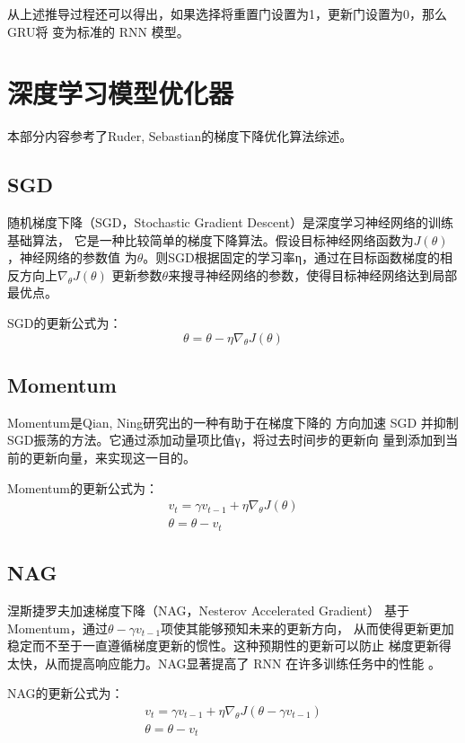 \documentclass[AutoFakeBold]{LZUThesis}
\begin{document}
从上述推导过程还可以得出，如果选择将重置门设置为1，更新门设置为0，那么GRU将
变为标准的 RNN 模型。

\section{深度学习模型优化器}
本部分内容参考了Ruder, Sebastian的梯度下降优化算法综述\cite{ruder2016overview}。
\subsection{SGD}
随机梯度下降（SGD，Stochastic Gradient Descent）是深度学习神经网络的训练基础算法，
它是一种比较简单的梯度下降算法。假设目标神经网络函数为$J(\theta)$，神经网络的参数值
为$\theta$。则SGD根据固定的学习率η，通过在目标函数梯度的相反方向上$\nabla_\theta J( \theta)$
更新参数$\theta$来搜寻神经网络的参数，使得目标神经网络达到局部最优点。

SGD的更新公式为：
$$\theta = \theta - \eta\nabla_\theta J( \theta)$$

\subsection{Momentum}
Momentum是Qian, Ning研究出的\cite{qian1999momentum}一种有助于在梯度下降的
方向加速 SGD 并抑制SGD振荡的方法。它通过添加动量项比值γ，将过去时间步的更新向
量到添加到当前的更新向量，来实现这一目的。

Momentum的更新公式为：
$$
\begin{matrix}
v_t = \gamma v_{t-1} + \eta \nabla_\theta J( \theta)\\
\theta = \theta - v_t
\end{matrix}
$$

\subsection{NAG}
涅斯捷罗夫加速梯度下降（NAG，Nesterov Accelerated Gradient）\cite{nesterov1983method}
基于Momentum，通过$\theta - \gamma v_{t-1}$项使其能够预知未来的更新方向，
从而使得更新更加稳定而不至于一直遵循梯度更新的惯性。这种预期性的更新可以防止
梯度更新得太快，从而提高响应能力。NAG显著提高了 RNN 在许多训练任务中的性能
\cite{bengio2013advances}。

NAG的更新公式为：
$$
\begin{matrix}
v_t = \gamma v_{t-1} + \eta \nabla_\theta J( \theta - \gamma v_{t-1} )\\ 
\theta = \theta - v_t 
\end{matrix}
$$
\end{document}

